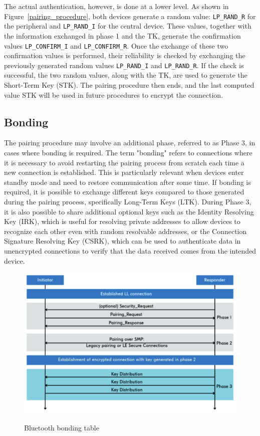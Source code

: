 \documentclass{Configuration_Files/PoliMi3i_thesis}
\begin{document}
The actual authentication, however, is done at a lower level. As shown in Figure~\ref{pairing_procedure}, both devices generate a random value: \texttt{LP\_RAND\_R} for the peripheral and \texttt{LP\_RAND\_I} for the central device. These values, together with the information exchanged in phase 1 and the TK, generate the confirmation values \texttt{LP\_CONFIRM\_I} and \texttt{LP\_CONFIRM\_R}. Once the exchange of these two confirmation values is performed, their reliability is checked by exchanging the previously generated random values \texttt{LP\_RAND\_I} and \texttt{LP\_RAND\_R}. If the check is successful, the two random values, along with the TK, are used to generate the Short-Term Key (STK). The pairing procedure then ends, and the last computed value STK will be used in future procedures to encrypt the connection.

\subsection{Bonding}

The pairing procedure may involve an additional phase, referred to as Phase 3, in cases where bonding is required. The term "bonding" refers to connections where it is necessary to avoid restarting the pairing process from scratch each time a new connection is established. This is particularly relevant when devices enter standby mode and need to restore communication after some time. If bonding is required, it is possible to exchange different keys compared to those generated during the pairing process, specifically Long-Term Keys (LTK). During Phase 3, it is also possible to share additional optional keys such as the Identity Resolving Key (IRK), which is useful for resolving private addresses to allow devices to recognize each other even with random resolvable addresses, or the Connection Signature Resolving Key (CSRK), which can be used to authenticate data in unencrypted connections to verify that the data received comes from the intended device. 

\begin{figure}[h]
\centering
\includegraphics[scale=0.7]{Bluetooth_Security/4.png}
\label{bluetooth_sec_4}
\caption{Bluetooth bonding table}
\end{figure}
\end{document}

